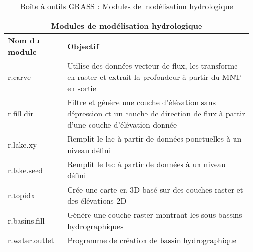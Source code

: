\begin{table}[H]
\centering
 \begin{tabular}{|p{4cm}|p{10cm}|}
    \hline \multicolumn{2}{|c|}{\textbf{Modules de modélisation hydrologique}} \\
  \hline \textbf{Nom du module} & \textbf{Objectif} \\
  \hline r.carve & Utilise des données vecteur de flux, les transforme en raster et extrait la profondeur à partir du MNT en sortie\\
  \hline r.fill.dir & Filtre et génère une couche d'élévation sans dépression et un couche de direction de flux à partir d'une couche d'élévation donnée \\
  \hline r.lake.xy & Remplit le lac à partir de données ponctuelles à un niveau défini \\
  \hline r.lake.seed & Remplit le lac à partir de données à un niveau défini \\
  \hline r.topidx & Crée une carte en 3D basé sur des couches raster et des élévations 2D \\
  \hline r.basins.fill & Génère une couche raster montrant les sous-bassins hydrographiques \\
  \hline r.water.outlet & Programme de création de bassin hydrographique \\
\hline
\end{tabular}
\caption{Boîte à outils GRASS : Modules de modélisation hydrologique}
\end{table}

